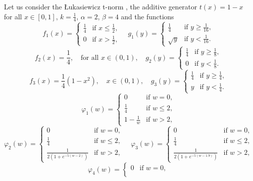 \begin{example}\label{example:nilpotent:(EP)}
Let us consider the Łukasiewicz t-norm \TLK, the additive generator $t(x)=1-x$ for all $x \in [0,1]$, $k=\frac{1}{4}$, $\alpha=2$, $\beta=4$ and the functions
$$
f_1(x)
=
\left\{ \begin{array}{ll}
	\frac{1}{4} &  \text{if }  x \leq \frac{1}{2}, \\[1pt]
	0 & \text{if } x>\frac{1}{2}, 
\end{array}
\right.
\quad
g_1(y)
=
\left\{ \begin{array}{ll}
	\frac{1}{4} &  \text{if }  y \geq \frac{1}{16}, \\[1pt]
	\sqrt{y} & \text{if } y<\frac{1}{16}. 
\end{array}
\right.	
$$
$$
f_2(x)=\frac{1}{4}, \quad \text{for all } x \in (0,1), \quad
g_2(y)
=
\left\{ \begin{array}{ll}
	\frac{1}{4} &  \text{if }  y \geq \frac{1}{8}, \\[1pt]
	0 & \text{if } y<\frac{1}{8}. 
\end{array}
\right.	
$$
$$f_3(x)=\frac{1}{4}(1-x^2), \quad x \in (0,1), \quad
g_3(y)
=
\left\{ \begin{array}{ll}
	\frac{1}{4} &  \text{if }  y \geq \frac{1}{4}, \\[1pt]
	y & \text{if } y<\frac{1}{4}. 
\end{array}
\right.	
$$
$$
\varphi_1(w)
=
\left\{ \begin{array}{ll}
	0 & \text{if } w=0, \\
	\frac{1}{4} &  \text{if }  w \leq 2, \\[1pt]
	1-\frac{1}{w} & \text{if } w>2, 
\end{array}
\right.
$$
$$
\varphi_2(w)
=
\left\{ \begin{array}{ll}
	0 & \text{if } w=0, \\
	\frac{1}{4} &  \text{if }  w \leq 2, \\[1pt]
	\frac{1}{2(1+e^{-5(w-2)})} & \text{if } w>2, 
\end{array}
\right.
\quad
\varphi_3(w)
=
\left\{ \begin{array}{ll}
	0 & \text{if } w=0, \\
	\frac{1}{4} &  \text{if }  w \leq 2, \\[1pt]
	\frac{1}{2(1+e^{-5(w-1.9)})} & \text{if } w>2, 
\end{array}
\right.	
$$
$$
\varphi_4(w)
=
\left\{ \begin{array}{ll}
	0 & \text{if } w=0, \\

\end{array}$$
\end{example}

